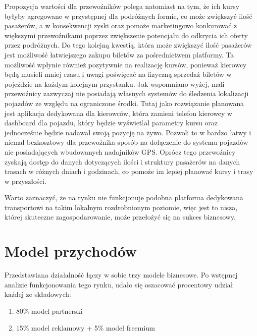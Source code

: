 Propozycja wartości dla przewoźników polega natomiast na tym, że ich kursy byłyby agregowane w przystępnej dla podróżnych formie, co może zwiększyć ilość pasażerów, a w konsekwencji zyski oraz pomoże marketingowo konkurować z większymi przewoźnikami poprzez zwiększenie potencjału do odkrycia ich oferty przez podróżnych. Do tego kolejną kwestią, która może zwiększyć ilość pasażerów jest możliwość łatwiejszego zakupu biletów za pośrednictwem platformy. Ta możliwość wpłynie również pozytywnie na realizację kursów, ponieważ kierowcy będą musieli mniej czasu i uwagi poświęcać na fizyczną sprzedaż biletów w pojeździe na każdym kolejnym przystanku. Jak wspomniano wyżej, mali przewoźnicy zazwyczaj nie posiadają własnych systemów do śledzenia lokalizacji pojazdów ze względu na ograniczone środki. Tutaj jako rozwiązanie planowana jest aplikacja dedykowana dla kierowców, która zamieni telefon kierowcy w dashboard dla pojazdu, który będzie wyświetlał parametry kursu oraz jednocześnie będzie nadawał swoją pozycję na żywo. Pozwoli to w bardzo łatwy i niemal bezkosztowy dla przewoźnika sposób na dołączenie do systemu pojazdów nie posiadających wbudowanych nadajników GPS. Oprócz tego przewoźnicy zyskają dostęp do danych dotyczących ilości i struktury pasażerów na danych trasach w różnych dniach i godzinach, co pomoże im lepiej planować kursy i trasy w przyszłości.

Warto zaznaczyć, że na rynku nie funkcjonuje podobna platforma dedykowana transportowi na takim lokalnym rozdrobnionym poziomie, więc jest to nisza, której skuteczne zagospodarowanie, może przełożyć się na sukces biznesowy.

\section{Model przychodów}

Przedstawiana działalność łączy w sobie trzy modele biznesowe. Po wstępnej
analizie funkcjonowania tego rynku, udało się oszacować procentowy udział każdej ze
składowych:

\begin{enumerate}

    \item 80\% model partnerski
    \item 15\% model reklamowy + 5\% model freemium
    
\end{enumerate}


